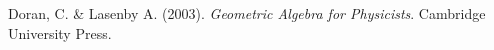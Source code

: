 \newpage
\begin{thebibliography}{1}
    
 Doran, C. \& Lasenby A. (2003). \emph{Geometric Algebra for Physicists}. Cambridge University Press.
     
     
      
	
	
	
	
	
	
	
	
	
	
	
\end{thebibliography}

